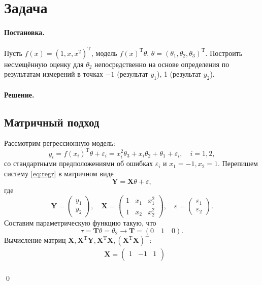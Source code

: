 \documentclass[specialist, subf, href, 12pt]{article}
\newenvironment{statement}{\paragraph{Постановка.}}{\hfill}
\newenvironment{solution}{\paragraph{Решение.}}{\hfill\\\hfill\qed}
\begin{document}
	\section{Задача}
	\begin{statement}
		Пусть $f(x)=(1,x,x^2)^\mathrm{T}$, модель $f(x)^\mathrm{T}\theta$, $\theta=(\theta_1, \theta_2, \theta_3)^\mathrm{T}$. Построить несмещённую оценку для $\theta_2$ непосредственно на основе определения по результатам измерений в точках $-1$ (результат $y_1$), 1 (результат $y_2$).
	\end{statement}
	\begin{solution}
		\subsection{Матричный подход}
		Рассмотрим регрессионную модель:
		\begin{equation}
			y_i=f(x_i)^\mathrm{T}\theta + \varepsilon_i=x_i^2\theta_3 + x_i\theta_2 + \theta_1 + \varepsilon_i,\quad i=1,2,\label{eq:regr}
		\end{equation}
		со стандартными предположениями об ошибках $\varepsilon_i$ и $x_1=-1,x_2=1$. Перепишем систему \eqref{eq:regr} в матричном виде
		\begin{equation*}
			\bm{Y} = \bm{X}\theta+\varepsilon,
		\end{equation*} 
		где
		\begin{equation*}
			\bm{Y}=\begin{pmatrix}
				y_1\\
				y_2
			\end{pmatrix},\quad\bm{X}=\begin{pmatrix}
			1&x_1&x_1^2\\
			1&x_2&x_2^2
			\end{pmatrix},\quad\varepsilon=\begin{pmatrix}
			\varepsilon_1\\
			\varepsilon_2
			\end{pmatrix}.
		\end{equation*}
		Составим параметрическую функцию такую, что
		\begin{equation*}
			\tau = \bm{T}\theta = \theta_2\rightarrow\bm{T}=(0\quad1\quad0).
		\end{equation*}
		Вычисление матриц $\bm{X},\bm{X}^\mathrm{T}\bm{Y}, \bm{X}^\mathrm{T}\bm{X},(\bm{X}^\mathrm{T}\bm{X})^-$:
		\begin{align*}
			&\bm{X}=\begin{pmatrix}
				1&-1&1\\

\end{pmatrix}
\end{align*}
\end{solution}
\end{document}
